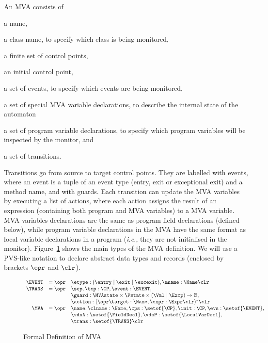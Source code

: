 An MVA consists of
\begin{inparaenum}
\item a name,
\item a class name, to specify which class is being monitored,
\item a finite set of control points,
\item an initial control point,
\item a set of events, to specify which events are being monitored,
\item a set of special MVA variable declarations, to describe
the internal state of the automaton
\item a set of program variable declarations, to specify which
program variables will be inspected by the monitor, and
\item a set of transitions.
\end{inparaenum}
Transitions go from source to target control points. They are labelled
with events, where an event is a tuple of an event type (entry, exit
or exceptional exit) and a method name, and with guards. Each
transition can update the MVA variables by executing a list of
actions, where each action assigns the result of an expression
(containing both program and MVA variables) to a MVA variable. MVA
variables declarations are the same as program field declarations
(defined below), while program variable declarations in the MVA have
the same format as local variable declarations in a program
(\emph{i.e.}, they are not initialised in the
monitor). Figure~\ref{FigMVAForm} shows the main types of the MVA
definition.  We will use a PVS-like notation to declare abstract data
types and records (enclosed by brackets \(\opr\) and \(\clr\)).

\begin{figure}[t]
\[
\begin{array}{rcl}
\EVENT & = \opr & \etype : (\entry \mid \exit \mid \excexit), 
                 \mname : \Name \clr\\
\TRANS & = \opr & \scp, \tcp : \CP, \event : \EVENT, \\
& & 
\guard : \MVAstate \times \Pstate \times (\Val \mid \Excp) \rightarrow \mathbb{B}, \\
&& \action : (\opr \target : \Name, \expr : \Expr \clr)^* \clr\\
\MVA & = \opr & \name, \clname : \Name, \cps : \setof{\CP},
            \init : \CP, \evs : \setof{\EVENT},\\
     &   &  \vdsA : \setof{\FieldDecl}, \vdsP : \setof{\LocalVarDecl},\\
     &   &  \trans : \setof{\TRANS} \clr
\end{array}
\]
\caption{Formal Definition of MVA}\label{FigMVAForm}
\end{figure}

